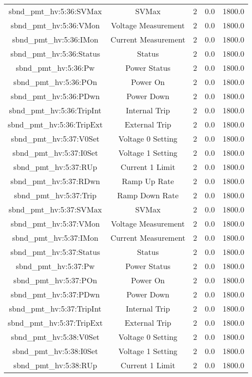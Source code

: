 \begin{center}
\begin{longtable}{c | c c c c }
sbnd\_pmt\_hv:5:36:SVMax & SVMax & 2 & 0.0 & 1800.0\\ 
sbnd\_pmt\_hv:5:36:VMon & Voltage Measurement & 2 & 0.0 & 1800.0\\ 
sbnd\_pmt\_hv:5:36:IMon & Current Measurement & 2 & 0.0 & 1800.0\\ 
sbnd\_pmt\_hv:5:36:Status & Status & 2 & 0.0 & 1800.0\\ 
sbnd\_pmt\_hv:5:36:Pw & Power Status & 2 & 0.0 & 1800.0\\ 
sbnd\_pmt\_hv:5:36:POn & Power On & 2 & 0.0 & 1800.0\\ 
sbnd\_pmt\_hv:5:36:PDwn & Power Down & 2 & 0.0 & 1800.0\\ 
sbnd\_pmt\_hv:5:36:TripInt & Internal Trip & 2 & 0.0 & 1800.0\\ 
sbnd\_pmt\_hv:5:36:TripExt & External Trip & 2 & 0.0 & 1800.0\\ 
sbnd\_pmt\_hv:5:37:V0Set & Voltage 0 Setting & 2 & 0.0 & 1800.0\\ 
sbnd\_pmt\_hv:5:37:I0Set & Voltage 1 Setting & 2 & 0.0 & 1800.0\\ 
sbnd\_pmt\_hv:5:37:RUp & Current 1 Limit & 2 & 0.0 & 1800.0\\ 
sbnd\_pmt\_hv:5:37:RDwn & Ramp Up Rate & 2 & 0.0 & 1800.0\\ 
sbnd\_pmt\_hv:5:37:Trip & Ramp Down Rate & 2 & 0.0 & 1800.0\\ 
sbnd\_pmt\_hv:5:37:SVMax & SVMax & 2 & 0.0 & 1800.0\\ 
sbnd\_pmt\_hv:5:37:VMon & Voltage Measurement & 2 & 0.0 & 1800.0\\ 
sbnd\_pmt\_hv:5:37:IMon & Current Measurement & 2 & 0.0 & 1800.0\\ 
sbnd\_pmt\_hv:5:37:Status & Status & 2 & 0.0 & 1800.0\\ 
sbnd\_pmt\_hv:5:37:Pw & Power Status & 2 & 0.0 & 1800.0\\ 
sbnd\_pmt\_hv:5:37:POn & Power On & 2 & 0.0 & 1800.0\\ 
sbnd\_pmt\_hv:5:37:PDwn & Power Down & 2 & 0.0 & 1800.0\\ 
sbnd\_pmt\_hv:5:37:TripInt & Internal Trip & 2 & 0.0 & 1800.0\\ 
sbnd\_pmt\_hv:5:37:TripExt & External Trip & 2 & 0.0 & 1800.0\\ 
sbnd\_pmt\_hv:5:38:V0Set & Voltage 0 Setting & 2 & 0.0 & 1800.0\\ 
sbnd\_pmt\_hv:5:38:I0Set & Voltage 1 Setting & 2 & 0.0 & 1800.0\\ 
sbnd\_pmt\_hv:5:38:RUp & Current 1 Limit & 2 & 0.0 & 1800.0\\ 

\end{longtable}
\end{center}
